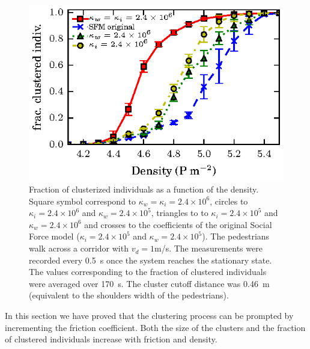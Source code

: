 \begin{figure}[htbp!]
\includegraphics[width=\columnwidth]
{plots/fracc_clusteriz_vs_density.eps}
\caption{\label{fic} Fraction of clusterized individuals as a function of the density. Square symbol correspond to $\kappa_w=\kappa_i=2.4\times 10^6$, circles to $\kappa_i=2.4\times 10^6$ and $\kappa_w=2.4\times 10^5$, triangles to to $\kappa_i=2.4\times 10^5$ and $\kappa_w=2.4\times 10^6$ and crosses to the coefficients of the original Social Force model ($\kappa_i=2.4\times 10^5$ and $\kappa_w=2.4\times 10^5$). The pedestrians walk across a corridor with $v_d=1$m/s. The measurements were recorded every 0.5~s once the system reaches the stationary state. The values corresponding to the fraction of clustered individuals were averaged over 170~s. The cluster cutoff distance was 0.46~m (equivalent to the shoulders width of the pedestrians).}
\end{figure}

In this section we have proved that the clustering process can be prompted by incrementing the friction coefficient. Both the size of the clusters and the fraction of clustered individuals increase with friction and density.\\

